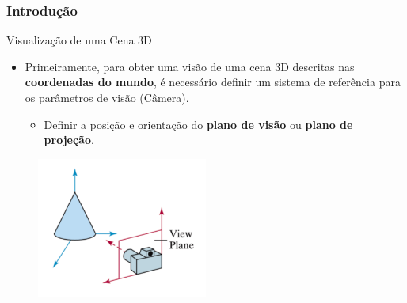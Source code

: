 \documentclass{beamer}
\begin{document}
\begin{frame}
\frametitle{Introdução}


	\begin{block}{Visualização de uma Cena 3D}
		\begin{itemize}
			\item Primeiramente, para obter uma visão de uma cena 3D descritas nas \textbf{coordenadas do mundo}, é necessário definir um sistema de referência para os parâmetros de visão (Câmera).
		
			\begin{itemize}
				\item Definir a posição e orientação do \textbf{plano de visão} ou \textbf{plano de projeção}.
			\end{itemize}
		\end{itemize}
	\end{block}
	
	\begin{figure}[!h]
			\begin{center}
			\includegraphics[width=0.5\textwidth]{Figures/ViePla}
			\end{center}
	\end{figure}	
\end{frame}
\end{document}
